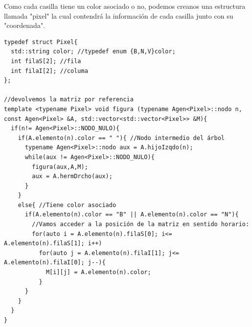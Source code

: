 Como cada casilla tiene un color asociado o no, podemos creanos una estructura llamada "pixel" la cual contendrá la información de cada casilla junto con su "coordenada".
\begin{verbatim}
typedef struct Pixel{
  std::string color; //typedef enum {B,N,V}color;
  int filaS[2]; //fila
  int filaI[2]; //columa
};

//devolvemos la matriz por referencia 
template <typename Pixel> void figura (typename Agen<Pixel>::nodo n, const Agen<Pixel> &A, std::vector<std::vector<Pixel>> &M){
  if(n!= Agen<Pixel>::NODO_NULO){
    if(A.elemento(n).color == " "){ //Nodo intermedio del árbol
      typename Agen<Pixel>::nodo aux = A.hijoIzqdo(n);
      while(aux != Agen<Pixel>::NODO_NULO){
        figura(aux,A,M);
        aux = A.hermDrcho(aux);
      }
    }
    else{ //Tiene color asociado
      if(A.elemento(n).color == "B" || A.elemento(n).color == "N"){
        //Vamos acceder a la posición de la matriz en sentido horario:
        for(auto i = A.elemento(n).filaS[0]; i<= A.elemento(n).filaS[1]; i++)
          for(auto j = A.elemento(n).filaI[1]; j<= A.elemento(n).filaI[0]; j--){
            M[i][j] = A.elemento(n).color;
          }
      }
    }
  }
}
\end{verbatim}